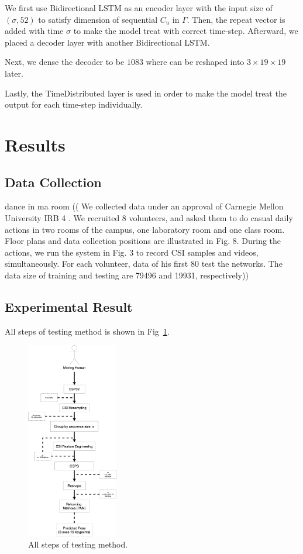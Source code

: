 \documentclass[10pt,letterpaper]{article}
\begin{document}
We first use Bidirectional LSTM as an encoder layer with the input size of $(\sigma,52)$ to satisfy dimension of sequential $C_u$ in $\Gamma$.
Then, the repeat vector is added with time $\sigma$ to make the model treat with correct time-step. Afterward, we placed a decoder layer with another Bidirectional LSTM. 

Next, we dense the decoder to be $1083$ where can be reshaped into $3\times 19\times 19$ later.

Lastly,  the TimeDistributed layer is used in order to make the model treat the output for each time-step individually.



\section*{Results}

\subsection*{Data Collection}
dance in ma room
((
We collected data under an approval of Carnegie Mellon University IRB 4
. We recruited 8 volunteers,
and asked them to do casual daily actions in two rooms of the campus, one laboratory room and one
class room. Floor plans and data collection positions are illustrated in Fig. 8. During the actions, we
run the system in Fig. 3 to record CSI samples and videos, simultaneously. For each volunteer, data
of his first 80%
test the networks. The data size of training and testing are 79496 and 19931, respectively))


\subsection*{Experimental Result}


All steps of testing method is shown in Fig~\ref{fig:TESTSTEP}. 

\begin{figure}[htbp]
	\centerline{\includegraphics[width=40mm,scale=0.2]{TESTSTEP06.png}}
	\caption{All steps of testing method.}
	\label{fig:TESTSTEP}
\end{figure}
\end{document}
